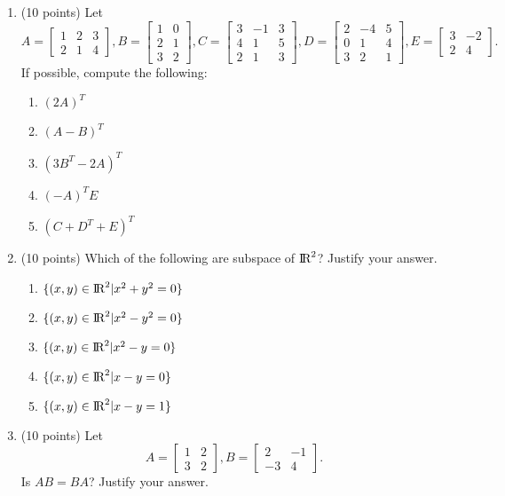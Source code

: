 \documentclass[11pt]{article}
\begin{document}
\begin{enumerate}
\item  (10 points) Let 
$$ 
  A = \begin{bmatrix} 1 & 2& 3\\ 2 & 1 & 4 \end{bmatrix},
  B = \begin{bmatrix} 1 & 0 \\ 2 & 1 \\ 3 & 2\end{bmatrix}, 
  C = \begin{bmatrix} 3 & -1 & 3 \\ 4 & 1 & 5\\ 2 & 1 & 3 \end{bmatrix}, 
  D = \begin{bmatrix} 2 & -4 & 5 \\ 0 & 1 & 4\\ 3 & 2 & 1 \end{bmatrix}, 
  E = \begin{bmatrix} 3 & -2 \\ 2 & 4 \end{bmatrix}.
$$
If possible, compute the following:
\begin{enumerate}
\item $(2A)^T$
\item $(A-B)^T$
\item $(3B^T - 2A)^T$
\item $(-A)^T E$
\item $(C+ D^T + E)^T$
\end{enumerate}

\item  (10 points) Which of the following are subspace of ${\rm\hbox{I\kern-.15em R}}^2$? Justify your answer. 
\begin{enumerate}
\item $\{(x,y ) \in {\rm\hbox{I\kern-.15em R}}^2 | x^2 + y^2 = 0 \}$
\item $\{(x,y ) \in {\rm\hbox{I\kern-.15em R}}^2 | x^2 - y^2 = 0 \}$
\item $\{(x,y ) \in {\rm\hbox{I\kern-.15em R}}^2 | x^2 - y = 0 \}$
\item $\{(x,y ) \in {\rm\hbox{I\kern-.15em R}}^2 | x - y = 0 \}$
\item $\{(x,y ) \in {\rm\hbox{I\kern-.15em R}}^2 | x - y = 1 \}$
\end{enumerate}

\item  (10 points) Let 
$$ A = \begin{bmatrix}1 & 2\\ 3 & 2\end{bmatrix}, B =  \begin{bmatrix}2 & -1\\ -3 & 4\end{bmatrix}.$$
Is $AB = BA$? Justify your answer. 


\end{enumerate}
\end{document}
